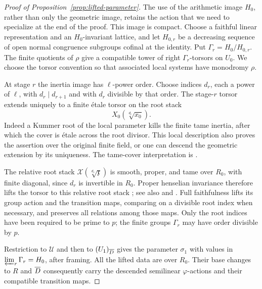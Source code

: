 \begin{proof}[Proof of Proposition~\ref{prop:lifted-parameter}]
The use of the arithmetic image $H_0$, rather than only the geometric
image, retains the action that we need to specialize at the end of the
proof.  This image is compact.  Choose a faithful linear
representation and an $H_0$-invariant lattice, and let
$H_{0,r}$ be a decreasing sequence of open normal congruence subgroups
cofinal at the identity.  Put $\Gamma_r=H_0/H_{0,r}$.  The finite
quotients of $\rho$ give a compatible tower of right $\Gamma_r$-torsors
on $U_0$.  We choose the torsor convention so that associated local
systems have monodromy $\rho$.

At stage $r$ the inertia image has $\ell$-power order.  Choose indices
$d_r$, each a power of $\ell$, with $d_r\mid d_{r+1}$ and with $d_r$
divisible by that order.  The stage-$r$ torsor extends uniquely to a
finite \'etale torsor on the root stack
\[
                 X_0(\sqrt[d_r]{x_0}).
\]
Indeed a Kummer root of the local parameter kills the finite tame
inertia, after which the cover is \'etale across the root divisor.
This local description also proves the assertion over the original
finite field, or one can descend the geometric extension by its
uniqueness.  The tame-cover interpretation is
\cite[Proposition~A.10]{LieblichOlsson}.

The relative root stack
$\mathscr X(\sqrt[d_r]{\mathfrak x})$ is smooth, proper, and tame over
$R_0$, with finite diagonal, since $d_r$ is invertible in $R_0$.
Proper henselian invariance therefore lifts the torsor to this
relative root stack \cite[Theorem~4.5]{Rydh}; see also
\cite[Theorem~A.11 and Corollaries~A.12--A.13]{LieblichOlsson} and
\cite[Sections~8.3 and~8.5]{CT}.  Full faithfulness lifts its group
action and the transition maps, comparing on a divisible root index
when necessary, and preserves all relations among those maps.  Only
the root indices have been required to be prime to $p$; the finite
groups $\Gamma_r$ may have order divisible by $p$.

Restriction to $\mathscr U$ and then to $(U_1)_{\overline D}$ gives the
parameter $\sigma_1$ with values in
$\varprojlim_r\Gamma_r=H_0$, after framing.  All the lifted data are
over $R_0$.  Their base changes to $R$ and $\overline D$ consequently carry
the descended semilinear $\varphi$-actions and their compatible
transition maps.


\end{proof}
